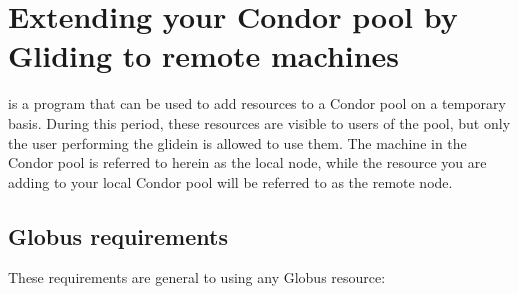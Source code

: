 \section{\label{sec:Glidein}Extending your Condor pool by Gliding to remote machines}

 is a program that can be used to add resources to a Condor 
pool on a temporary basis. During this period, these resources are visible 
to users of the pool, but only the user performing the glidein is allowed 
to use them. The machine in the Condor pool is referred to herein as the
local node, while the resource you are adding to your local Condor pool
will be referred to as the remote node.

\subsection{Globus requirements}
These requirements are general to using any Globus resource:
